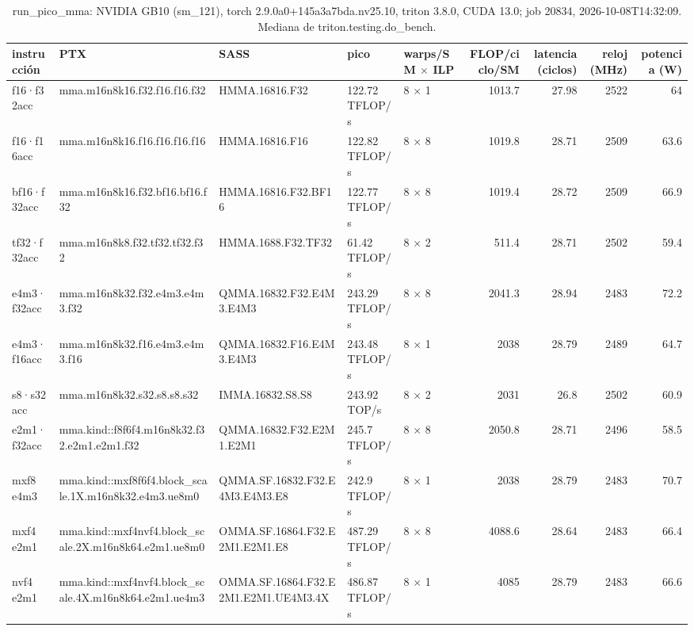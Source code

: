 \begin{table}[htbp]
  \centering\small
  \begin{tabular}{lllllrrrr}
    \toprule
    instrucción & PTX & SASS & pico & warps/SM $\times$ ILP & FLOP/ciclo/SM & latencia (ciclos) & reloj (MHz) & potencia (W) \\
    \midrule
    f16·f32acc & mma.m16n8k16.f32.f16.f16.f32 & HMMA.16816.F32 & 122.72 TFLOP/s & 8 $\times$ 1 & 1013.7 & 27.98 & 2522 & 64 \\
    f16·f16acc & mma.m16n8k16.f16.f16.f16.f16 & HMMA.16816.F16 & 122.82 TFLOP/s & 8 $\times$ 8 & 1019.8 & 28.71 & 2509 & 63.6 \\
    bf16·f32acc & mma.m16n8k16.f32.bf16.bf16.f32 & HMMA.16816.F32.BF16 & 122.77 TFLOP/s & 8 $\times$ 8 & 1019.4 & 28.72 & 2509 & 66.9 \\
    tf32·f32acc & mma.m16n8k8.f32.tf32.tf32.f32 & HMMA.1688.F32.TF32 & 61.42 TFLOP/s & 8 $\times$ 2 & 511.4 & 28.71 & 2502 & 59.4 \\
    e4m3·f32acc & mma.m16n8k32.f32.e4m3.e4m3.f32 & QMMA.16832.F32.E4M3.E4M3 & 243.29 TFLOP/s & 8 $\times$ 8 & 2041.3 & 28.94 & 2483 & 72.2 \\
    e4m3·f16acc & mma.m16n8k32.f16.e4m3.e4m3.f16 & QMMA.16832.F16.E4M3.E4M3 & 243.48 TFLOP/s & 8 $\times$ 1 & 2038 & 28.79 & 2489 & 64.7 \\
    s8·s32acc & mma.m16n8k32.s32.s8.s8.s32 & IMMA.16832.S8.S8 & 243.92 TOP/s & 8 $\times$ 2 & 2031 & 26.8 & 2502 & 60.9 \\
    e2m1·f32acc & mma.kind::f8f6f4.m16n8k32.f32.e2m1.e2m1.f32 & QMMA.16832.F32.E2M1.E2M1 & 245.7 TFLOP/s & 8 $\times$ 8 & 2050.8 & 28.71 & 2496 & 58.5 \\
    mxf8 e4m3 & mma.kind::mxf8f6f4.block\_scale.1X.m16n8k32.e4m3.ue8m0 & QMMA.SF.16832.F32.E4M3.E4M3.E8 & 242.9 TFLOP/s & 8 $\times$ 1 & 2038 & 28.79 & 2483 & 70.7 \\
    mxf4 e2m1 & mma.kind::mxf4nvf4.block\_scale.2X.m16n8k64.e2m1.ue8m0 & OMMA.SF.16864.F32.E2M1.E2M1.E8 & 487.29 TFLOP/s & 8 $\times$ 8 & 4088.6 & 28.64 & 2483 & 66.4 \\
    nvf4 e2m1 & mma.kind::mxf4nvf4.block\_scale.4X.m16n8k64.e2m1.ue4m3 & OMMA.SF.16864.F32.E2M1.E2M1.UE4M3.4X & 486.87 TFLOP/s & 8 $\times$ 1 & 4085 & 28.79 & 2483 & 66.6 \\
    \bottomrule
  \end{tabular}
  \caption{run\_pico\_mma: NVIDIA GB10 (sm\_121), torch 2.9.0a0+145a3a7bda.nv25.10, triton 3.8.0, CUDA 13.0; job 20834, 2026-10-08T14:32:09. Mediana de triton.testing.do\_bench.}
  \label{tab:hennessy-run-pico-mma}
\end{table}
